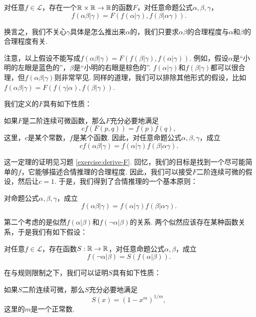 \begin{hypothesis}\label{hypothesis:form-of-F}
    对任意$f\in\mathcal L$，存在一个$\mathbb{R}\times\mathbb{R}\to\mathbb{R}$的函数$F$，对任意命题公式$\alpha,\beta,\gamma$，
    \[
        f(\alpha\beta|\gamma)=F(f(\alpha|\gamma),f(\beta|\alpha\gamma)).
    \]
\end{hypothesis}

换言之，我们不关心$\gamma$具体是怎么推出来$\alpha$的，我们只要求$\alpha\beta$的合理程度与$\alpha$和$\beta$的合理程度有关. 

注意，以上假设不能写成$f(\alpha\beta|\gamma) = F(f(\beta|\gamma), f(\alpha|\gamma))$. 例如，假设$\alpha$是“小明的左眼是蓝色的”，$\beta$是“小明的右眼是棕色的”. $f(\alpha|\gamma)$和$f(\beta|\gamma)$都可以很合理，但$f(\alpha\beta|\gamma)$则非常罕见. 同样的道理，我们可以排除其他形式的假设，比如$f(\alpha\beta|\gamma) = F(f(\gamma|\alpha), f(\beta|\gamma))$.

我们定义的$F$具有如下性质：
\begin{theorem}\label{theorem:form-of-F}
    如果$F$是二阶连续可微函数，那么$F$充分必要地满足
        \[cf(F(p,q))=f(p)f(q),\]
        这里，$c$是某个常数，$f$是某个函数.
        因此，对任意命题公式$\alpha,\beta,\gamma$，成立
        \[cf(\alpha\beta|\gamma)=f(\alpha|\gamma)f(\beta|\alpha\gamma).\]
\end{theorem}

这一定理的证明见习题 \ref{exercise:derive-F}. 回忆，我们的目标是找到一个尽可能简单的$f$，它能够描述合情推理的合理程度. 因此，我们可以接受$F$二阶连续可微的假设，然后让$c=1$. 于是，我们得到了合情推理的一个基本原则：
\begin{principle}[与规则]
对命题公式$\alpha,\beta,\gamma$，成立
\[f(\alpha\beta|\gamma)=f(\alpha|\gamma)f(\beta|\alpha\gamma).\]
\end{principle}

第二个考虑的是似然$f(\alpha|\beta)$和$f(\neg\alpha|\beta)$的关系. 两个似然应该存在某种函数关系，于是我们有如下假设：

\begin{hypothesis}
    对任意$f\in\mathcal L$，存在函数$S:\mathbb{R}\to\mathbb{R}$，对任意命题公式$\alpha,\beta$，成立
    \[f(\neg\alpha|\beta)=S(f(\alpha|\beta)).\]
\end{hypothesis}

在与规则限制之下，我们可以证明$S$具有如下性质：
\begin{theorem}\label{theorem:form-of-S}
    如果$S$二阶连续可微，那么$S$充分必要地满足
    \begin{equation*}
        S(x) = (1 - x^m)^{1/m},
    \end{equation*}
    这里的$m$是一个正常数.
\end{theorem}

